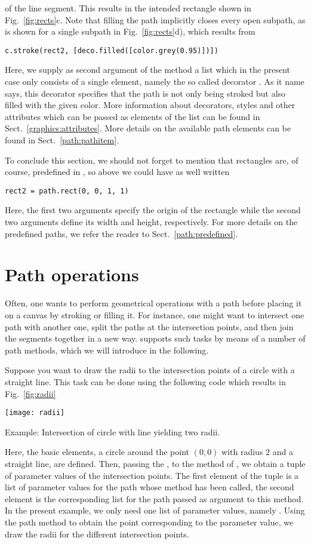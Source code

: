 of the line segment. This results in the intended rectangle shown in
Fig.~\ref{fig:rects}c. Note that filling the path implicitly closes
every open subpath, as is shown for a single subpath in
Fig.~\ref{fig:rects}d), which results from
\begin{verbatim}
c.stroke(rect2, [deco.filled([color.grey(0.95)])])
\end{verbatim}
Here, we supply as second argument of the  method a
list which in the present case only consists of a single element,
namely the so called decorator . As it name says,
this decorator specifies that the path is not only being stroked but
also filled with the given color. More information about decorators,
styles and other attributes which can be passed as elements of the
list can be found in Sect.~\ref{graphics:attributes}.  More details on
the available path elements can be found in Sect.~\ref{path:pathitem}.

To conclude this section, we should not forget to mention that
rectangles are, of course, predefined in \PyX{}, so above we could
have as well written
\begin{verbatim}
rect2 = path.rect(0, 0, 1, 1)
\end{verbatim}
Here, the first two arguments specify the origin of the rectangle
while the second two arguments define its width and height,
respectively. For more details on the predefined paths, we
refer the reader to Sect.~\ref{path:predefined}.

\section{Path operations}

Often, one wants to perform geometrical operations with a path before
placing it on a canvas by stroking or filling it.  For instance, one
might want to intersect one path with another one, split the paths at
the intersection points, and then join the segments together in a new
way. \PyX{} supports such tasks by means of a number of path methods,
which we will introduce in the following.

Suppose you want to draw the radii to the intersection points of a
circle with a straight line. This task can be done using the following
code which results in Fig.~\ref{fig:radii}

\texttt{[image: radii]}
\centerline{Example: Intersection of circle with line yielding two radii.}
Here, the basic elements, a circle around the point $(0, 0)$ with
radius $2$ and a straight line, are defined. Then, passing the , to
the  method of , we obtain a tuple of
parameter values of the intersection points. The first element of the
tuple is a list of parameter values for the path whose
 method has been called, the second element is the
corresponding list for the path passed as argument to this method. In
the present example, we only need one list of parameter values, namely
.  Using the  path method to obtain
the point corresponding to the parameter value, we draw the radii for
the different intersection points. 

